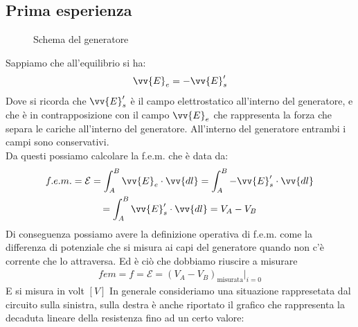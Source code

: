 \documentclass[a4paper, oneside]{article}
\newcommand{\E}{\mathcal{E}}
\begin{document}
\subsection{Prima esperienza}
\leavevmode
\begin{figure}
    \centering
    \caption{Schema del generatore}
    \end{figure}\noindent
Sappiamo che all'equilibrio si ha:
\begin{gather*}
    \vv{E}_e = -\vv{E}'_s
\end{gather*}
Dove si ricorda che $\vv{E}'_s$ è il campo elettrostatico all'interno del generatore, e che è in contrapposizione con il campo $\vv{E}_e$ che rappresenta la forza che separa le cariche all'interno del generatore. All'interno del 
generatore entrambi i campi sono conservativi.\\
Da questi possiamo calcolare la f.e.m. che è data da:
\begin{gather*}
    f.e.m. = \E = \int_{A}^{B} \vv{E}_e \cdot \vv{dl} = \int_{A}^{B} -\vv{E}'_s \cdot \vv{dl}\\
    = \int_{A}^{B} \vv{E}'_s \cdot \vv{dl} = V_A-V_B
\end{gather*}
Di conseguenza possiamo avere la definizione operativa di f.e.m. come la differenza di potenziale che si misura ai capi del generatore quando non c'è corrente che lo attraversa. Ed è ciò che dobbiamo riuscire a misurare\\
\begin{gather*}
    fem = f = \mathcal{E} = (V_A - V_B)_\text{misurata} \vert_{i=0}
\end{gather*}
E si misura in volt $[V]$
In generale consideriamo una situazione rappresetata dal circuito sulla sinistra, sulla destra è anche riportato il grafico che rappresenta la decaduta lineare della resistenza fino ad un certo valore:
\end{document}
